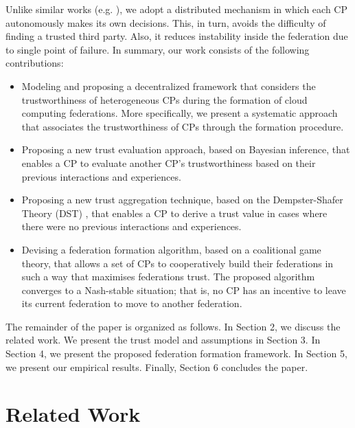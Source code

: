 \documentclass[preprint]{elsarticle}
\theoremstyle{definition}
\theoremstyle{remark}
\theoremstyle{property}
\begin{document}
Unlike similar works (e.g. \cite{hassan2015qos}), we adopt a distributed
mechanism in which each CP autonomously makes its own decisions. This, in turn, avoids the difficulty of finding a trusted third party. Also, it reduces instability inside the federation due to single point of failure. In summary, our work consists of the following contributions:

\begin{itemize}

\item Modeling and proposing a decentralized framework that considers the trustworthiness of heterogeneous CPs during
the formation of cloud computing federations. More specifically, we present a systematic approach that associates the
trustworthiness of CPs through the formation procedure.

\item Proposing a new trust evaluation approach, based on Bayesian inference, that enables a CP to evaluate another CP's trustworthiness based on their previous interactions and experiences.

\item Proposing a new trust aggregation technique, based
on the Dempster-Shafer Theory (DST) \cite{shafer1992dempster}, that enables a CP to derive a trust value in cases where there were no previous interactions and experiences.

\item Devising a federation formation algorithm, based on a coalitional game theory, that allows a set of CPs
to cooperatively build their federations in such a way that maximises federations trust. The proposed algorithm converges to a Nash-stable situation; that is, no CP has an incentive to leave its current federation to move to
another federation.
\end{itemize}



The remainder of the paper is organized as follows. In Section 2, we discuss the related work. We present the trust model and assumptions in Section 3. In Section 4, we present the proposed federation formation framework. In Section 5, we present our empirical results. Finally, Section 6 concludes the paper.


\section{Related Work}
\end{document}
